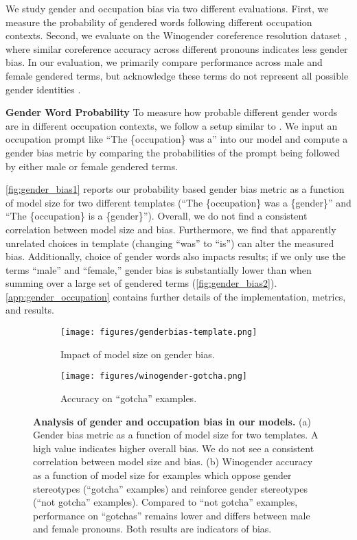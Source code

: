 \documentclass[11pt, a4paper, logo, internal, copyright, nonumbering]{deepmind}
\begin{document}
We study gender and occupation bias via two different evaluations.
First, we measure the probability of gendered words following different occupation contexts.
Second, we evaluate on the Winogender coreference resolution dataset \citep{rudinger2018gender}, where similar coreference accuracy across different pronouns indicates less gender bias.
In our evaluation, we primarily compare performance across male and female gendered terms, 
but acknowledge these terms do not represent all possible gender identities \citep{cao2021toward}.

\noindent\textbf{Gender Word Probability} To measure how probable different gender words are in different occupation contexts, we follow a setup similar to \cite{gpt3}.
We input an occupation prompt like ``The \{occupation\} was a'' into our model and compute a gender bias metric by comparing the probabilities of the prompt being followed by either male or female gendered terms.

\autoref{fig:gender_bias1} reports our probability based gender bias metric as a function of model size for two different templates (``The \{occupation\} was a \{gender\}'' and ``The \{occupation\} is a \{gender\}'').
Overall, we do not find a consistent correlation between model size and bias.
Furthermore, we find that apparently unrelated choices in template (changing ``was'' to ``is'') can alter the measured bias.
Additionally, choice of gender words also impacts results; if we only use the terms ``male'' and ``female,'' gender bias is substantially lower than when summing over a large set of gendered terms (\autoref{fig:gender_bias2}). \autoref{app:gender_occupation} contains further details of the implementation, metrics, and results.

\begin{figure}[t]
  \centering
\begin{subfigure}[b]{.4\textwidth}
  \centering
  \texttt{[image: figures/genderbias-template.png]}
  \caption{Impact of model size on gender bias.}
     \label{fig:gender_bias1}
\end{subfigure}
\begin{subfigure}[b]{.4\textwidth}
  \centering
  \texttt{[image: figures/winogender-gotcha.png]}
  \caption{Accuracy on ``gotcha'' examples.}
    \label{fig:Winogender-gotcha}
\end{subfigure}
\hfill
  \caption{ \textbf{Analysis of gender and occupation bias in our models.}  (a) Gender bias metric 
  as a function of model size for two templates.  A high value indicates higher overall bias.  We do not see a consistent correlation between model size and bias.  (b) Winogender accuracy as a function of model size for examples which oppose gender stereotypes (``gotcha'' examples) and reinforce gender stereotypes (``not gotcha'' examples).  Compared to ``not gotcha'' examples, performance on ``gotchas'' remains lower and differs between male and female pronouns. Both results are indicators of bias.
  }
\end{figure}
\end{document}
